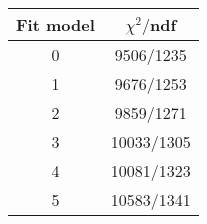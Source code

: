 \begin{tabular}{c|c}
Fit model & $\chi^2/$ndf \\
\hline
0 & 9506/1235\\
1 & 9676/1253\\
2 & 9859/1271\\
3 & 10033/1305\\
4 & 10081/1323\\
5 & 10583/1341\\
\end{tabular}
